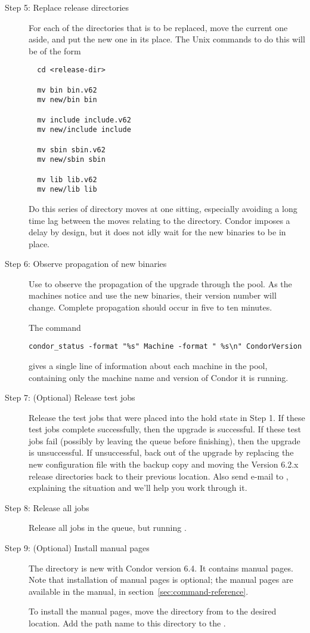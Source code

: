 \begin{description}
\item[Step 5:  Replace release directories]
For each of the directories that is to be replaced,
move the current one aside, and put the new one in its place.
The Unix commands to do this will be of the form
\begin{verbatim}
  cd <release-dir>

  mv bin bin.v62
  mv new/bin bin

  mv include include.v62
  mv new/include include

  mv sbin sbin.v62
  mv new/sbin sbin

  mv lib lib.v62
  mv new/lib lib
\end{verbatim}

Do this series of directory moves at one
sitting, especially avoiding a long time lag between the moves
relating to the  directory.
Condor imposes a delay by design, but it does not idly wait for the
new binaries to be in place.

\item[Step 6:  Observe propagation of new binaries]

Use  to observe the propagation of the upgrade
through the pool.
As the machines notice and use the new binaries, their
version number will change.
Complete propagation should occur in five to ten minutes.

The command
\begin{verbatim}
condor_status -format "%s" Machine -format " %s\n" CondorVersion
\end{verbatim}
gives a single line of information about each machine in the pool,
containing only the machine name and version of Condor it is
running.

\item[Step 7:  (Optional) Release test jobs]
Release the test jobs that were placed into the hold state
in Step 1.
If these test jobs complete successfully, then the upgrade is
successful.
If these test jobs fail (possibly by leaving the queue before
finishing), then the upgrade is unsuccessful.
If unsuccessful, back out of the upgrade by
replacing the new configuration file with the backup copy and
moving the Version 6.2.x release directories back to their
previous location.
Also send e-mail to ,
explaining the situation and we'll help you work through it.

\item[Step 8:  Release all jobs]
Release all jobs in the queue, but running .

\item[Step 9:  (Optional) Install manual pages]

The  directory is new with Condor version 6.4.
It contains manual pages.
Note that installation of manual pages is optional;
the manual pages are available in the manual, in
section~\ref{sec:command-reference}.

To install the manual pages, move the  directory
from  to the desired location.
Add the path name to this directory to the
.

\end{description}

